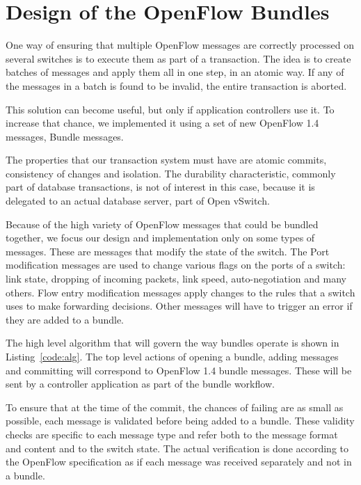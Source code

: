 \chapter{Design of the OpenFlow Bundles}
\label{chapter:architecture}  

One way of ensuring that multiple OpenFlow messages are correctly processed on several switches
is to execute them as part of a transaction. The idea is to create batches of messages and apply them
all in one step, in an atomic way. If any of the messages in a batch is found to be invalid, the entire
transaction is aborted.

This solution can become useful, but only if application controllers use it. To increase that chance, we
implemented it using a set of new OpenFlow 1.4 messages, Bundle messages.

The properties that our transaction system must have are atomic commits, consistency of changes and isolation.
The durability characteristic, commonly part of database transactions, is not of interest in this case, because
it is delegated to an actual database server, part of Open vSwitch.

Because of the high variety of OpenFlow messages that could be bundled together, we focus our design
and implementation only on some types of messages. These are messages that modify the state of the switch.
The Port modification messages are used to change various flags on the ports of a switch: link state,
dropping of incoming packets, link speed, auto-negotiation and many others. Flow entry modification messages
apply changes to the rules that a switch uses to make forwarding decisions. Other messages will have to
trigger an error if they are added to a bundle.

The high level algorithm that will govern the way bundles operate is shown in Listing~\ref{code:alg}. The top
level actions of opening a bundle, adding messages and committing will correspond to OpenFlow 1.4 bundle messages.
These will be sent by a controller application as part of the bundle workflow.

To ensure that at the time of the commit, the chances of failing are as small as possible, each message
is validated before being added to a bundle. These validity checks are specific to each message type and refer
both to the message format and content and to the switch state. The actual verification is done according to
the OpenFlow specification as if each message was received separately and not in a bundle.

